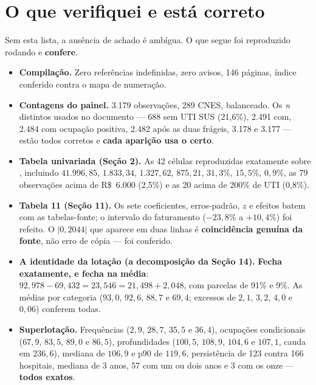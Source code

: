 \documentclass[12pt,a4paper]{article}
\newcommand{\arq}[1]{\texttt{\detokenize{#1}}}
\begin{document}
\newpage
\section{O que verifiquei e está correto}

Sem esta lista, a ausência de achado é ambígua. O que segue foi
reproduzido rodando e \textbf{confere}.

\begin{itemize}[leftmargin=*]
\item \textbf{Compilação.} Zero referências indefinidas, zero avisos,
  146 páginas, índice conferido contra o mapa de numeração.

\item \textbf{Contagens do painel.} 3.179 observações, 289 CNES,
  balanceado. Os \emph{n} distintos usados no documento --- 688 sem UTI
  SUS (21,6\%), 2.491 com, 2.484 com ocupação positiva, 2.482 após as
  duas frágeis, 3.178 e 3.177 --- estão todos corretos e \textbf{cada
  aparição usa o certo}.

\item \textbf{Tabela univariada (Seção 2).} As 42 células reproduzidas
  exatamente sobre \arq{custo_real}, incluindo $41.996{,}85$,
  $1.833{,}34$, $1.327{,}62$, $875{,}21$, $31{,}3\%$, $15{,}5\%$,
  $0{,}9\%$, as 79 observações acima de R\$~6.000 (2,5\%) e as 20 acima
  de 200\% de UTI (0,8\%).

\item \textbf{Tabela 11 (Seção 11).} Os sete coeficientes, erros-padrão,
  $z$ e efeitos batem com as tabelas-fonte; o intervalo do faturamento
  ($-23{,}8\%$ a $+10{,}4\%$) foi refeito. O $|0{,}2044|$ que aparece em
  duas linhas é \textbf{coincidência genuína da fonte}, não erro de
  cópia --- foi conferido.

\item \textbf{A identidade da lotação (a decomposição da Seção 14).}
  \textbf{Fecha exatamente, e fecha na média}:
  $92{,}978 - 69{,}432 = 23{,}546 = 21{,}498 + 2{,}048$, com parcelas de
  91\% e 9\%. As médias por categoria ($93{,}0$, $92{,}6$, $88{,}7$ e
  $69{,}4$; excessos de $2{,}1$, $3{,}2$, $4{,}0$ e $0{,}06$) conferem
  todas.

\item \textbf{Superlotação.} Frequências ($2{,}9$, $28{,}7$, $35{,}5$ e
  $36{,}4$), ocupações condicionais ($67{,}9$, $83{,}5$, $89{,}0$ e
  $86{,}5$), profundidades ($100{,}5$, $108{,}9$, $104{,}6$ e $107{,}1$,
  cauda em $236{,}6$), mediana de $106{,}9$ e p90 de $119{,}6$,
  persistência de 123 contra 166 hospitais, mediana de 3 anos, 57 com um
  ou dois anos e 3 com os onze --- \textbf{todos exatos}.


\end{itemize}
\end{document}
